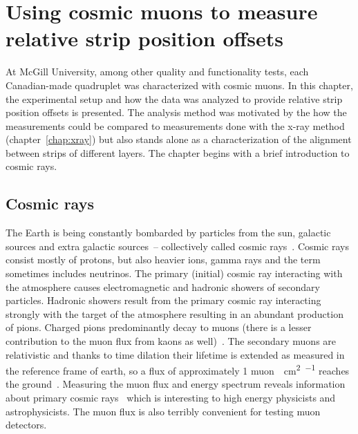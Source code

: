 
\chapter{Using cosmic muons to measure relative strip position offsets}
\label{chap:cosmics}

At McGill University, among other quality and functionality tests, each Canadian-made quadruplet was characterized with cosmic muons. In this chapter, the experimental setup and how the data was analyzed to provide relative strip position offsets is presented. The analysis method was motivated by the how the measurements could be compared to measurements done with the x-ray method (chapter~\ref{chap:xray}) but also stands alone as a characterization of the alignment between strips of different layers. The chapter begins with a brief introduction to cosmic rays.

\section{Cosmic rays}

The Earth is being constantly bombarded by particles from the sun, galactic sources and extra galactic sources~-- collectively called cosmic rays~\cite{boezio_chemical_2012, zyla_review_2020}. Cosmic rays consist mostly of protons, but also heavier ions, gamma rays and the term sometimes includes neutrinos. The primary (initial) cosmic ray interacting with the atmosphere causes electromagnetic and hadronic showers of secondary particles. Hadronic showers result from the primary cosmic ray interacting strongly with the target of the atmosphere resulting in an abundant production of pions. Charged pions predominantly decay to muons (there is a lesser contribution to the muon flux from kaons as well)~\cite{grieder_cosmic_2001}. The secondary muons are relativistic and thanks to time dilation their lifetime is extended as measured in the reference frame of earth, so a flux of approximately 1 muon\SI{}{\per\cm\squared\per\min} reaches the ground~\cite{zyla_review_2020}. Measuring the muon flux and energy spectrum reveals information about primary cosmic rays~\cite{grieder_cosmic_2001} which is interesting to high energy physicists and astrophysicists. The muon flux is also terribly convenient for testing muon detectors.

